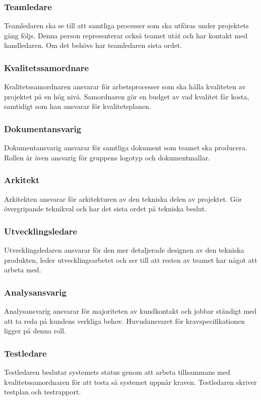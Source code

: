 \subsubsection*{Teamledare}
Teamledaren ska se till att samtliga processer som ska utföras under projektets gång följs. Denna person representerar också teamet utåt och har kontakt med handledaren. Om det behövs har teamledaren sista ordet.

\subsubsection*{Kvalitetssamordnare}
Kvalitetssamordnaren ansvarar för arbetsprocesser som ska hålla kvaliteten av projektet på en hög nivå. Samordnaren gör en budget av vad kvalitet får kosta, samtidigt som han ansvarar för kvalitetsplanen.

\subsubsection*{Dokumentansvarig}
Dokumentansvarig ansvarar för samtliga dokument som teamet ska producera. Rollen är även ansvarig för gruppens logotyp och dokumentmallar.

\subsubsection*{Arkitekt}
Arkitekten ansvarar för arkitekturen av den tekniska delen av projektet. Gör övergripande teknikval och har det sista ordet på tekniska beslut.

\subsubsection*{Utvecklingsledare}
Utvecklingsledaren ansvarar för den mer detaljerade designen av den tekniska produkten, leder utvecklingsarbetet och ser till att resten av teamet har något att arbeta med.

\subsubsection*{Analysansvarig}
Analysansvarig ansvarar för majoriteten av kundkontakt och jobbar ständigt med att ta reda på kundens verkliga behov. Huvudansvaret för kravspecifikationen ligger på denna roll.

\subsubsection*{Testledare}
Testledaren beslutar systemets status genom att arbeta tillsammans med kvalitetssamordnaren för att testa så systemet uppnår kraven. Testledaren skriver testplan och testrapport.

